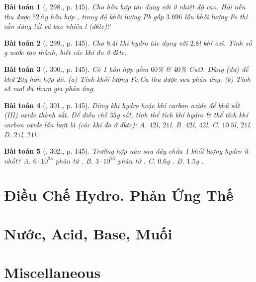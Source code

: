 \documentclass{article}
\newtheorem{baitoan}{Bài toán}
\begin{document}
\begin{baitoan}[\cite{An_400_BT_Hoa_Hoc_8_2020}, 298., p. 145]
	Cho hỗn hợp \emph{} tác dụng với \emph{} ở nhiệt độ cao. Hỏi nếu thu được $52.6$\emph{g} hỗn hợp \emph{}, trong đó khối lượng \emph{Pb} gấp $3.696$ lần khối lượng \emph{Fe} thì cần dùng tất cả bao nhiêu \emph{l} \emph{} (đktc)?
\end{baitoan}

\begin{baitoan}[\cite{An_400_BT_Hoa_Hoc_8_2020}, 299., p. 145]
	Cho $8.4$\emph{l} khí hydro tác dụng với $2.8$\emph{l} khí oxi. Tính số \emph{g} nước tạo thành, biết các khí đo ở đktc.
\end{baitoan}

\begin{baitoan}[\cite{An_400_BT_Hoa_Hoc_8_2020}, 300., p. 145]
	Có 1 hỗn hợp gồm $60$\% \emph{} \& $40$\% \emph{CuO}. Dùng \emph{} (dư) để khử $20$\emph{g} hỗn hợp đó. (a) Tính khối lượng \emph{Fe,Cu} thu được sau phản ứng. (b) Tính số mol \emph{} đã tham gia phản ứng.
\end{baitoan}

\begin{baitoan}[\cite{An_400_BT_Hoa_Hoc_8_2020}, 301., p. 145]
	Dùng khí hydro hoặc khí carbon oxide để khử sắt (III) oxide thành sắt. Để điều chế $35$\emph{g} sắt, tính thể tích khí hydro \& thể tích khí carbon oxide lần lượt là (các khí đo ở đktc): {\sf A.} $42$\emph{l}, $21$\emph{l}. {\sf B.} $42$\emph{l}, $42$\emph{l}. {\sf C.} $10.5$\emph{l}, $21$\emph{l}. {\sf D.} $21$\emph{l}, $21$\emph{l}.
\end{baitoan}

\begin{baitoan}[\cite{An_400_BT_Hoa_Hoc_8_2020}, 302., p. 145]
	Trường hợp nào sau đây chứa 1 khối lượng hydro ít nhất? {\sf A.} $6\cdot10^{23}$ phân tử \emph{}. {\sf B.} $3\cdot10^{23}$ phân tử \emph{}. {\sf C.} $0.6$\emph{g} \emph{}. {\sf D.} $1.5$\emph{g} \emph{}.
\end{baitoan}


\section{Điều Chế Hydro. Phản Ứng Thế}


\section{Nước, Acid, Base, Muối}


\section{Miscellaneous}


\printbibliography[heading=bibintoc]
	
\end{document}

